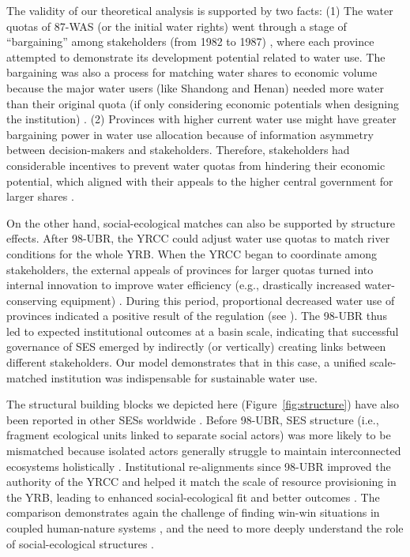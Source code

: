 The validity of our theoretical analysis is supported by two facts:
(1) The water quotas of 87-WAS (or the initial water rights) went through a stage of ``bargaining'' among stakeholders (from 1982 to 1987) \cite{wang2019a, wang2019d}, where each province attempted to demonstrate its development potential related to water use.
The bargaining was also a process for matching water shares to economic volume because the major water users (like Shandong and Henan) needed more water than their original quota (if only considering economic potentials when designing the institution) \cite{zuo2020}.
(2) Provinces with higher current water use might have greater bargaining power in water use allocation because of information asymmetry between decision-makers and stakeholders.
Therefore, stakeholders had considerable incentives to prevent water quotas from hindering their economic potential, which aligned with their appeals to the higher central government for larger shares \cite{wang2019a, wang2019d}.

\label{discussion-3}
On the other hand, social-ecological matches can also be supported by structure effects.
After 98-UBR, the YRCC could adjust water use quotas to match river conditions for the whole YRB.
When the YRCC began to coordinate among stakeholders, the external appeals of provinces for larger quotas turned into internal innovation to improve water efficiency (e.g., drastically increased water-conserving equipment)
\cite{krieger1955, ostrom1990}.
During this period, proportional decreased water use of provinces indicated a positive result of the regulation (see ).
The 98-UBR thus led to expected institutional outcomes at a basin scale, indicating that successful governance of SES emerged by indirectly (or vertically) creating links between different stakeholders.
Our model demonstrates that in this case, a unified scale-matched institution was indispensable for sustainable water use.

The structural building blocks we depicted here (Figure~\ref{fig:structure}) have also been reported in other SESs worldwide \cite{kluger2020,guerrero2015,bodin2012}.
Before 98-UBR, SES structure (i.e., fragment ecological units linked to separate social actors) was more likely to be mismatched because isolated actors generally struggle to maintain interconnected ecosystems holistically \cite{sayles2017,sayles2019,cai2016,bergsten2019}.
Institutional re-alignments since 98-UBR improved the authority of the YRCC and helped it match the scale of resource provisioning in the YRB, leading to enhanced social-ecological fit and better outcomes \cite{cumming2020a,wang2019d}.
The comparison demonstrates again the challenge of finding win-win situations in coupled human-nature systems \cite{hegwood2022}, and the need to more deeply understand the role of social-ecological structures \cite{bergsten2019, sayles2019}.

